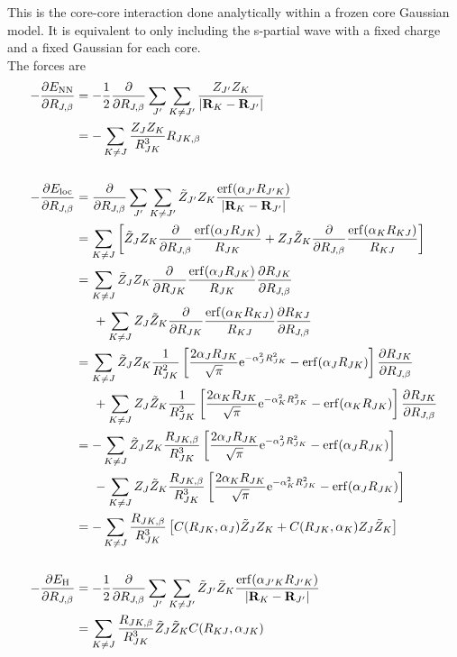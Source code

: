 \documentclass[paper=a4, fontsize=11pt]{article} %
\numberwithin{equation}{section} %
\numberwithin{figure}{section} %
\numberwithin{table}{section} %
\newcommand{\p}{\partial}
\newcommand{\bR}{{\bf{R}}}
\newcommand{\rNN}{{\mathrm{NN}}}
\newcommand{\re}{{\mathrm{e}}}
\newcommand{\rerf}{{\mathrm{erf}}}
\newcommand{\rH}{{\mathrm{H}}}
\newcommand{\rlo}{{\mathrm{loc}}}
\newcommand{\al}{{\alpha}}
\newcommand{\RJb}{{R_{J,\beta}}}
\begin{document}
This is the core-core interaction done analytically within a frozen core Gaussian model. It is equivalent to only including the s-partial wave with a fixed charge and a fixed Gaussian for each core.\\

The forces are
\begin{equation}
\begin{split}
-\frac{\p E_{\rNN}}{\p \RJb} &= -\frac{1}{2}\frac{\p}{\p \RJb}\sum_{J'} \sum_{K \neq J'}\frac{Z_{J'}Z_{K}}{|\bR_K -\bR_{J'}|} \\
&=-\sum_{K \neq J} \frac{Z_{J}Z_{K}}{R_{JK}^{3}}R_{JK,\beta}\\ \\
-\frac{\p E_{\rlo}}{\p \RJb} &= \frac{\p}{\p \RJb}\sum_{J'} \sum_{K \neq J'}\tilde Z_{J'}  Z_K\frac{\rerf(\al_{J'}R_{J'K})}{|\bR_K -\bR_{J'}|} \\
&=\sum_{K \neq J}\left[\tilde Z_{J}  Z_K \frac{\p}{\p \RJb}\frac{\rerf(\al_{J}R_{JK})}{R_{JK}} +Z_{J} \tilde  Z_K \frac{\p}{\p \RJb}\frac{\rerf(\al_{K}R_{KJ})}{R_{KJ}} \right]\\
&= \sum_{K \neq J}\tilde Z_{J}  Z_K \frac{\p}{\p R_{JK}}\frac{\rerf(\al_{J}R_{JK})}{R_{JK}} \frac{\p R_{JK}}{\p \RJb} \\
&\hspace{5mm}+\sum_{K \neq J} Z_{J} \tilde  Z_K \frac{\p}{\p R_{JK}}\frac{\rerf(\al_{K}R_{KJ})}{R_{KJ}} \frac{\p R_{KJ}}{\p \RJb} \\
&= \sum_{K \neq J}\tilde Z_{J}  Z_K \frac{1}{R_{JK}^2}\left[ \frac{2\al_J R_{JK}}{\sqrt{\pi}}\re^{-\al_J^2 R_{JK}^2} - \rerf(\al_{J}R_{JK})\right]\frac{\p R_{JK}}{\p \RJb}\\
&\hspace{5mm}+ \sum_{K \neq J} Z_{J} \tilde  Z_K \frac{1}{R_{JK}^2}\left[ \frac{2\al_K R_{JK}}{\sqrt{\pi}}\re^{-\al_K^2 R_{JK}^2} - \rerf(\al_{K}R_{JK})\right]\frac{\p R_{JK}}{\p \RJb}\\
&=-\sum_{K \neq J}\tilde Z_{J}  Z_K  \frac{R_{JK,\beta}}{R_{JK}^3}\left[ \frac{2\al_J R_{JK}}{\sqrt{\pi}}\re^{-\al_J^2 R_{JK}^2} - \rerf(\al_{J}R_{JK})\right]\\ 
&\hspace{5mm}-\sum_{K \neq J} Z_{J} \tilde  Z_K \frac{R_{JK,\beta}}{R_{JK}^3}\left[ \frac{2\al_K R_{JK}}{\sqrt{\pi}}\re^{-\al_K^2 R_{JK}^2} - \rerf(\al_{J}R_{JK})\right] \\
&= -\sum_{K \neq J}\frac{R_{JK,\beta}}{R_{JK}^3} \left[C(R_{JK},\al_J)\tilde Z_J Z_K  + C(R_{JK},\al_K) Z_J \tilde Z_K\right]\\ \\
-\frac{\p E_{\rH}}{\p \RJb} &= -\frac{1}{2}\frac{\p}{\p \RJb}\sum_{J'} \sum_{K \neq J'}\tilde Z_{J'}\tilde Z_{K}\frac{\rerf(\al_{J'K}R_{J'K})}{|\bR_K -\bR_{J'}|} \\
&= \sum_{K \neq J}\frac{R_{JK,\beta}}{R_{JK}^3}\tilde Z_J \tilde Z_K C(R_{KJ},\al_{JK})\\ 
\end{split}
\end{equation}
\end{document}
